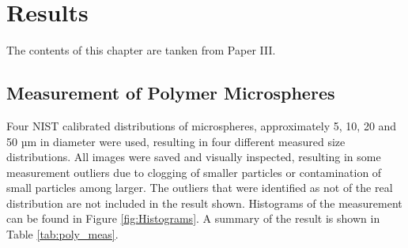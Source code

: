 
\chapter{Results}
\label{chap:results}

The contents of this chapter are tanken from Paper III.

\section{Measurement of Polymer Microspheres}

Four NIST calibrated distributions of microspheres, approximately 5, 10, 20 and 50 µm in diameter were used, resulting in four different measured size distributions. All images were saved and visually inspected, resulting in some measurement outliers due to clogging of smaller particles or contamination of small particles among larger. The outliers that were identified as not of the real distribution are not included in the result shown. Histograms of the measurement can be found in Figure \ref{fig:Histograms}. A summary of the result is shown in Table \ref{tab:poly_meas}.

